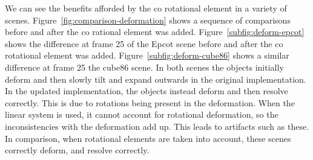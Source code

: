 \documentclass[11pt,a4paper]{article}
\begin{document}
We can see the benefits afforded by the co rotational element in a variety of scenes. 
Figure~\ref{fig:comparison-deformation} shows a sequence of comparisons before and after the co rational element was added. 
Figure~\ref{subfig:deform-epcot} shows the difference at frame 25 of the Epcot scene before and after the co rotational element was added. 
Figure~\ref{subfig:deform-cube86} shows a similar difference at frame 25 the cube86 scene. 
In both scenes the objects initially deform and then slowly tilt and expand outwards in the original implementation.
In the updated implementation, the objects instead deform and then resolve correctly. 
This is due to rotations being present in the deformation. 
When the linear system is used, it cannot account for rotational deformation, so the inconsistencies with the deformation add up. 
This leads to artifacts such as these.
In comparison, when rotational elements are taken into account, these scenes correctly deform, and resolve correctly. 
\end{document}
